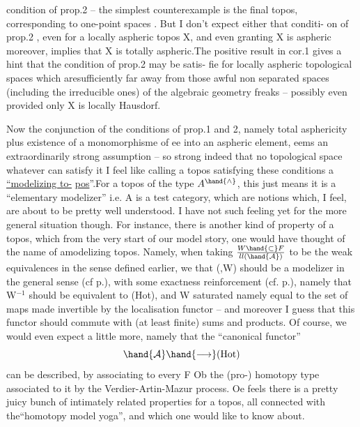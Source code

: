 condition of prop.2 -- the simplest counterexample is the final topos,
corresponding to one-point spaces . But I don't expect either that conditi-%
on of prop.2 , even for a locally aspheric topos X, and even granting
X is aspheric moreover, implies that X is totally aspheric.The positive 
result in cor.1 gives a hint that the condition of prop.2 may be satis-%
fie for locally aspheric topological spaces which aresufficiently far
away from those awful non separated spaces (including the irreducible ones)
of the algebraic geometry freaks -- possibly even  provided only
X is locally Hausdorf.

 Now the conjunction of the conditions of prop.1 and 2,  namely
total asphericity plus \hand{\unsure{*}}existence of  a monomorphisme of
e\hand{$\amalg$}e into an aspheric element, eems an extraordinarily strong assumption
-- so strong indeed that no topological space whatever can satisfy it\hand{!}
I feel like calling a topos satisfying these conditions a \uline{``modelizing to-}%
\uline{pos}''.For a topos of the type $A^{\hand{\wedge}}$, this just means it is a ``elementary 
modelizer'' i.e. A is a test category, which are notions which, I feel, are
about to be pretty well understood. I have not such feeling yet for the
more general situation though. For instance, there is another kind of
property of a topos, which from the very start of our model story, one
would have thought of  the name of amodelizing topos. Namely, when
taking $W \hand{\subset} F\over{l}{l}(\hand{\mathcal{A}})$ to be the weak equivalences in the sense defined earlier,
we  that  (,W) should be a modelizer in the general sense
(cf p.), with some exactness reinforcement (cf. p.), namely that
W$^{-1}$ should be equivalent to (Hot), and W saturated namely equal to the
set of maps made invertible by the localisation functor -- and moreover
I guess that this functor should commute with (at least finite) sums and
products. Of course, we would even expect a little more, namely that
the ``canonical functor''
\[ \hand{\mathcal{A}} \hand{\longrightarrow} (\mathrm{Hot}) \]
can be described, by associating to every F \hand{$\in$} Ob the (pro-) homotopy
type associated to it by the Verdier-Artin-Mazur process. Oe feels
there is a pretty juicy bunch of intimately related properties for a topos,
all connected with the``homotopy model yoga'', and which one would like to
know about.

